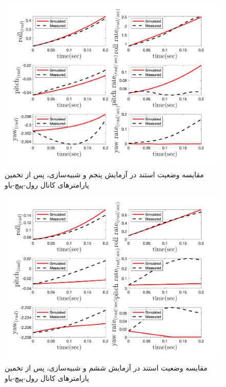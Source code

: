 \begin{figure}[H]
	\includegraphics[width=12cm]{../Figures/RCP/roll_pitch_yaw_parameter_estimation/RCP_roll_pitch_yaw_S6.png}
	\centering
	\caption{مقايسه وضعیت استند در  آزمايش پنجم و شبیه‌سازی، پس از تخمین پارامترهای کانال رول-پیچ-یاو}
	\label{ roll_pitch_yaw_ps5}
\end{figure}
\begin{figure}[H]
	\includegraphics[width=12cm]{../Figures/RCP/roll_pitch_yaw_parameter_estimation/RCP_roll_pitch_yaw_S7.png}
	\centering
	\caption{مقايسه وضعیت استند در  آزمايش ششم و شبیه‌سازی، پس از تخمین پارامترهای کانال رول-پیچ-یاو}
	\label{ roll_pitch_yaw_ps6}
\end{figure}

